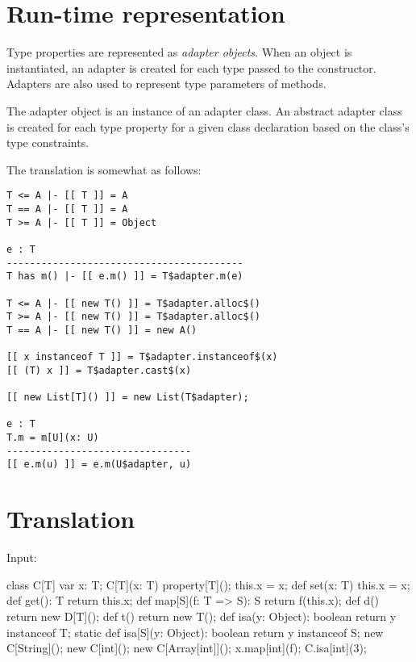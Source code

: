 \documentclass{llncs}
\begin{document}

\section{Run-time representation}

Type properties are represented as \emph{adapter objects}.
When an object is instantiated, an adapter is created for
each type passed to the constructor.
Adapters are also used to represent type parameters of methods.

The adapter object is an instance of an adapter class. 
An abstract adapter class is created for each type property
for a given class declaration based on the class's type
constraints.

The translation is somewhat as follows:

\begin{verbatim}
T <= A |- [[ T ]] = A
T == A |- [[ T ]] = A
T >= A |- [[ T ]] = Object

e : T
-----------------------------------------
T has m() |- [[ e.m() ]] = T$adapter.m(e)

T <= A |- [[ new T() ]] = T$adapter.alloc$()
T >= A |- [[ new T() ]] = T$adapter.alloc$()
T == A |- [[ new T() ]] = new A()

[[ x instanceof T ]] = T$adapter.instanceof$(x)
[[ (T) x ]] = T$adapter.cast$(x)

[[ new List[T]() ]] = new List(T$adapter);

e : T
T.m = m[U](x: U)
--------------------------------
[[ e.m(u) ]] = e.m(U$adapter, u)
\end{verbatim}

\section{Translation}

Input:
\begin{displayxten}
class C[T] {
    var x: T;
    C[T](x: T) { property[T](); this.x = x; }
    def set(x: T) { this.x = x; }
    def get(): T { return this.x; }
    def map[S](f: T => S): S { return f(this.x); }
    def d() { return new D[T](); }
    def t() { return new T(); }
    def isa(y: Object): boolean { return y instanceof T; }
    static def isa[S](y: Object): boolean { return y instanceof S; }
}
new C[String]();
new C[int]();
new C[Array[int]]();
x.map[int](f);
C.isa[int](3);
\end{displayxten}
\end{document}
